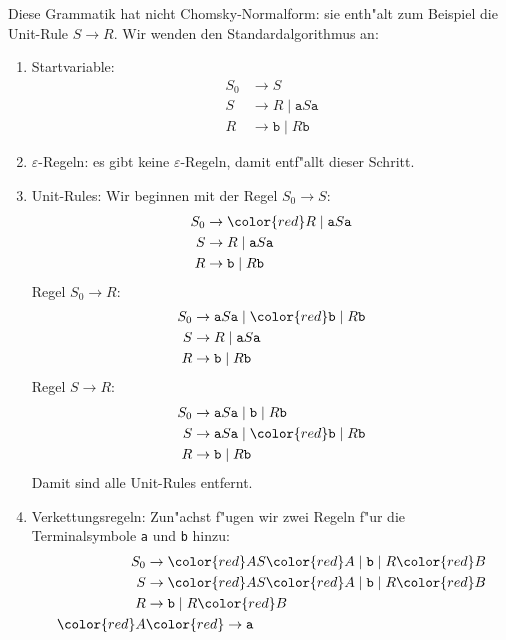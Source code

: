 \begin{loesung}
Diese Grammatik hat nicht Chomsky-Normalform: sie enth"alt zum Beispiel die
Unit-Rule $S\rightarrow R$.
Wir wenden den Standardalgorithmus an:
\begin{enumerate}
\item Startvariable: 
\begin{align*}
S_0&\rightarrow S                      \\
S  &\rightarrow R  \;|\; \texttt{a} S \texttt{a}\\
R  &\rightarrow \texttt{b} \;|\; R\texttt{b}
\end{align*}
\item $\varepsilon$-Regeln: es gibt keine $\varepsilon$-Regeln, damit
entf"allt dieser Schritt.
\item Unit-Rules: Wir beginnen mit der Regel $S_0\rightarrow S$:
\begin{align*}
S_0&\rightarrow \color{red} R  \;|\; \texttt{a} S \texttt{a}\\
S  &\rightarrow R  \;|\; \texttt{a} S \texttt{a}\\
R  &\rightarrow \texttt{b} \;|\; R\texttt{b}
\end{align*}
Regel $S_0\rightarrow R$:
\begin{align*}
S_0&\rightarrow \texttt{a} S \texttt{a} \;|\; \color{red}\texttt{b} \;|\; R\texttt{b} \\
S  &\rightarrow R  \;|\; \texttt{a} S \texttt{a}\\
R  &\rightarrow \texttt{b} \;|\; R\texttt{b}
\end{align*}
Regel $S\rightarrow R$:
\begin{align*}
S_0&\rightarrow \texttt{a} S \texttt{a} \;|\; \texttt{b} \;|\; R\texttt{b} \\
S  &\rightarrow \texttt{a} S \texttt{a} \;|\; \color{red} \texttt{b} \;|\; R\texttt{b}\\
R  &\rightarrow \texttt{b} \;|\; R\texttt{b}
\end{align*}
Damit sind alle Unit-Rules entfernt.
\item Verkettungsregeln: Zun"achst f"ugen wir zwei Regeln f"ur die
Terminalsymbole \texttt{a} und \texttt{b} hinzu:
\begin{align*}
S_0&\rightarrow {\color{red}A}S{\color{red}A} \;|\; \texttt{b} \;|\; R{\color{red}B} \\
S  &\rightarrow {\color{red}A}S{\color{red}A} \;|\; \texttt{b} \;|\; R{\color{red}B} \\
R  &\rightarrow \texttt{b} \;|\; R{\color{red}B} \\
\color{red}A  &\color{red}\rightarrow \texttt{a} \\

\end{align*}
\end{enumerate}
\end{loesung}
